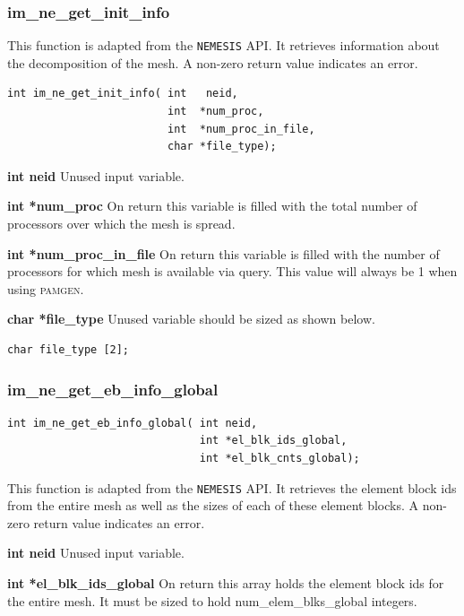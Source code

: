 \subsubsection{im\_ne\_get\_init\_info}
This function is adapted from the \texttt{NEMESIS} API. It retrieves information about the decomposition of the mesh. A non-zero return value indicates an error.
{\ttfamily  \begin{verbatim}
int im_ne_get_init_info( int   neid,
                         int  *num_proc,
                         int  *num_proc_in_file,
                         char *file_type);
\end{verbatim}}

{\setlength{\parindent}{0pt}
 \textbf{int neid} Unused input variable.}

{\setlength{\parindent}{0pt}
 \textbf{int *num\_proc} On return this variable is filled with the total number of processors over which the mesh is spread.}

{\setlength{\parindent}{0pt}
 \textbf{int *num\_proc\_in\_file} On return this variable is filled with the number of processors for which mesh is available via query. This value will always be 1 when using \textsc{pamgen}.}

{\setlength{\parindent}{0pt}
 \textbf{char *file\_type} Unused variable should be sized as shown below.}
{\ttfamily
	\begin{verbatim}char file_type [2];\end{verbatim}}

\subsubsection{im\_ne\_get\_eb\_info\_global}
{\ttfamily  \begin{verbatim}
int im_ne_get_eb_info_global( int neid,
                              int *el_blk_ids_global,
                              int *el_blk_cnts_global);
\end{verbatim}}
This function is adapted from the \texttt{NEMESIS} API. It retrieves the element block ids from the entire mesh as well as the sizes of each of these element blocks. A non-zero return value indicates an error.

{\setlength{\parindent}{0pt}
 \textbf{int neid} Unused input variable.}

{\setlength{\parindent}{0pt}
 \textbf{int *el\_blk\_ids\_global} On return this array holds the element block ids for the entire mesh. It must be sized to hold num\_elem\_blks\_global integers.}


